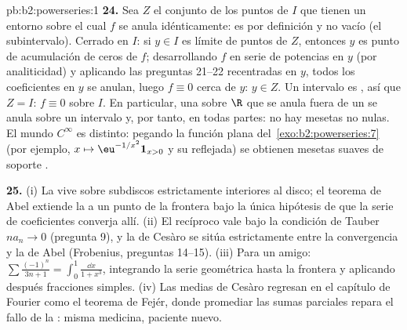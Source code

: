 \begin{solution}{pb:b2:powerseries:1}
\textbf{24.} Sea $Z$ el conjunto de los puntos de $I$ que tienen un
entorno sobre el cual $f$ se anula idénticamente: es  por
definición y no vacío (el subintervalo). Cerrado en $I$: si $y \in
I$ es límite de puntos de $Z$, entonces $y$ es punto de acumulación
de ceros de $f$; desarrollando $f$ en serie de potencias en $y$ (por
analiticidad) y aplicando las preguntas 21--22 recentradas en $y$,
todos los coeficientes en $y$ se anulan, luego $f \equiv 0$ cerca de
$y$: $y \in Z$. Un intervalo es , así que $Z = I$: $f \equiv
0$ sobre $I$. En particular, una  sobre $\R$ que se
anula fuera de un  se anula sobre un intervalo y, por tanto,
en todas partes: no hay mesetas  no nulas. El mundo
$C^\infty$ es distinto: pegando la función plana del~\cref{exo:b2:powerseries:7} (por ejemplo, $x \mapsto
\eu^{-1/x^2}\mathbf 1_{x>0}$ y su reflejada) se obtienen mesetas
suaves de soporte .

\textbf{25.} (i) La  vive sobre subdiscos
 estrictamente interiores al disco; el teorema de Abel
extiende la  a un punto de la frontera bajo la única
hipótesis de que la serie de coeficientes converja allí. (ii) El
recíproco vale bajo la condición de Tauber $na_n \to 0$ (pregunta
9), y la  de Cesàro se sitúa estrictamente entre la
convergencia y la  de Abel (Frobenius, preguntas
14--15). (iii) Para un amigo: $\sum\frac{(-1)^n}{3n+1} =
\int_0^1\frac{\dd x}{1+x^3}$, integrando la serie geométrica hasta
la frontera y aplicando después fracciones simples. (iv) Las medias
de Cesàro regresan en el capítulo de Fourier como el teorema de
Fejér, donde promediar las sumas parciales repara el fallo de la
: misma medicina, paciente nuevo.
\end{solution}
